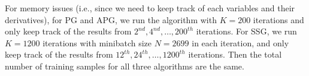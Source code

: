 \documentclass{article}
\numberwithin{equation}{section}
\numberwithin{figure}{section}
\begin{document}
For memory issues (i.e., since we need to keep track of each variables and their derivatives), for PG and APG, we run the algorithm with $K = 200$ iterations and only keep track of the results from $2^{nd}, 4^{nd}, \hdots, 200^{th} $ iterations. For SSG, we run $K = 1200$ iterations with minibatch size $N = 2699$ in each iteration, and only keep track of the results from $12^{th}, 24^{th}, \hdots, 1200^{th} $ iterations. Then the total number of training samples for all three algorithms are the same.
\end{document}
